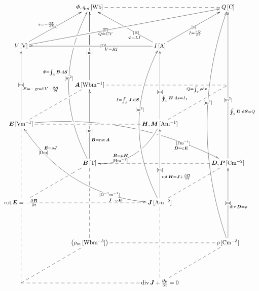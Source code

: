 \documentclass[a4j,10pt]{jarticle}
\makeatletter
\def\uni#1{[\!\unit{#1}]}
\def\cell#1#2{#1\,\uni{#2}}
\def\dottedhole#1{\ar@{--}[#1]|!{[ld];[lu]}\hole}
\def\dottedholea#1{\ar@{--}[#1]|!{[ld];[lu]}\hole |!{+(-9.5,-10);+(-9.5,10)}\hole }
\def\dotted#1{\ar@{--}[#1]}
\def\dotteda#1{\ar@{--}[#1] |!{+(11.5,-50);+(11.5,50)}\hole}
\def\arr#1#2#3#4#5{\ar[#1] |-(#2){\uni{#3}} _(#4){#5}}
\def\arruu#1#2#3#4{\arr{uu}{#1}{#2}{#3}{#4}}
\def\arruubefore#1{\arruu{0.4}{m}{0.33}{#1}}
\def\arruubeforemiddlehole{\arruubefore{}|-(0.5)\hole}
\def\arruumiddle#1{\arruu{0.5}{m}{0.45}{#1}}
\def\arrbeforeafter#1#2#3{\arr{#1}{0.4}{#2}{0.40}{#3}}
\def\arrmiddle#1#2#3{\arr{#1}{0.5}{#2}{0.45}{#3}}
\def\arruuuu#1#2#3#4{\arr{uuuu}{#1}{#2}{#3}{#4}}
\def\arruuuubefore#1{\arruuuu{0.4}{m^2}{0.33}{#1}}
\def\arrup#1#2#3#4#5{\ar[#1] |-(#2){\uni{#3}}^(#4){#5}}
\def\arrupbeforebeforebefore#1#2#3{\arrup{#1}{0.3}{#2}{0.3}{#3}}
\def\arrupmiddle#1#2#3{\arrup{#1}{0.5}{#2}{0.45}{#3}}
\def\arrupbeforebefore#1#2#3{\arrup{#1}{0.4}{#2}{0.35}{#3}}
\def\arrcv#1#2#3#4#5{\ar@/^3pc/[#1]|-(#2){\uni{#3}}^(#4){#5}}
\def\arrcvafter#1#2#3{\arrcv{#1}{0.6}{#2}{0.65}{#3}}
\def\arrowyyy#1#2#3{\ar@/^3pc/[#1] |-(0.24)\hole |-(0.25){} |-(0.42)\hole|-(.55){\uni{#2}}^(.58){#3}|!{[luuu];[uuur]}\hole  |-(.768)\hole |-(.78){} |-(.836)\hole}
\def\arrowyy#1#2#3#4#5{\ar@/_3pc/@{<->}[#1]|-(0.2){\uni{#4}}^(0.2){#5}|-(.75){\uni{#2}}_(.75){#3}}
\def\arrowz#1#2#3{\ar@/^2pc/[#1] |!{+(-10,-10);+(-10,10)}\hole|-(.7){\uni{#2}}_(.6){#3}}
\def\arrowzz#1#2#3{\ar@/^2.4pc/[#1] |-(.2)\hole |-(.21){} |-(.35)\hole |-(.38)\hole |-(.40)\hole |-(.44){} |-(.55)\hole |-(.64)\hole |-(.65){} |!{[rr];[rrdd]}\hole |-(.8){\uni{#2}}_(.8){#3\quad}}
\newcommand{\A}{\bm A}
\newcommand{\B}{\bm B}
\newcommand{\D}{\bm D}
\newcommand{\E}{\bm E}
\newcommand{\J}{\bm J}
\newcommand{\M}{\bm M}
\newcommand{\bmP}{\bm P}
\makeatother
\begin{document}
\begin{center}
\[\xymatrix@=0.70in{
  & \cell{\varPhi, q_m}{Wb}\dotted{rr}\ar@{-}[d]|!{[ld];[rr]}\hole & & \cell{Q}{C}\\
  \cell V V\arrupmiddle{ur}{s}{e=-\fracpd\varPhi t}\arrbeforeafter{rrru}{F}{Q=CV} & & \cell I A\arrupbeforebefore{ll}{O}{V=RI}\arrmiddle{ur}{s}{I=\diff Q t}\arrupbeforebeforebefore{lu}{H}{\varPhi=LI}|-(0.5)\hole & \\
  & \cell{\A}{Wbm^{-1}} \arruubeforemiddlehole|!{[lu];[ruru]}\hole & *=0{} & \dottedholea{ll}\dotted{ld}\\
  \cell{\E}{Vm^{-1}}\arruumiddle{\E=-\grad V-\frac{\partial\A}{\partial t}}\dotted{rr} |!{+(20,-10);+(20,10)}\hole |!{+(32.5,-10);+(32.5,10)}\hole \dotted{ru}\arrowzz{rrrd}{Fm^{-1}}{\D=\varepsilon\E}\arrowyy{rrdd}{O^{-1}m^{-1}}{\J=\sigma\E}{Om}{\E=\rho\J } & & \cell{\bm H,\M}{Am^{-1}}\arruubefore{\oint_C\bm H\cdot\dd s=I_f}\arrowz{dl}{Hm^{-1}}{\B=\mu\bm H} & \\
  & \cell{\B}{T}\arruubeforemiddlehole_(.3){\B=\rot \A}|-(.52)\hole |-(.54){} \arrowyyy{uuuu}{m^2}{\varPhi=\int_S\B\cdot\dd\bm S} & & \cell{\D,\bmP}{Cm^{-2}}\arruuuubefore{\oint_S\D\cdot\dd\bm{S}=Q}\dottedhole{ll}\dotted{ld}\\
  {\rot\E=-\frac{\partial\B}{\partial t}}\dotted{uu}\dotted{rr}\dotteda{ru} & & \cell{\J}{Am^{-2}}\arruubefore{\rot\bm H=\J +\frac{\partial\D}{\partial t}}\arrcvafter{uuuu}{m^2}{I=\int_S\J\cdot\dd\bm S}\\
  & \left(\cell{\rho_m}{Wbm^{-3}}\right)\ar@{--}[uu]|!{[u];[u]}\hole |-(.73)\hole & & \cell{\rho}{Cm^{-3}}\arruumiddle{\diver\D=\rho}\arrcvafter{uuuuuu}{m^3}{Q=\int_v\rho\dd v}\dottedhole{ll}\dotted{ld}\\
  *=0{} \dotted{uu}\dotted{rr}\dotted{ru} & & \diver\J +\frac{\partial\rho}{\partial t}=0\dotted{uu} |!{+(-10,-10);(10,-10)}\hole & \\
}\]


\end{center}
\end{document}
